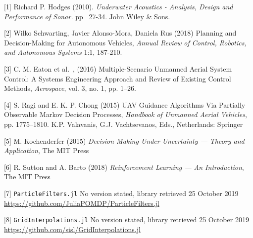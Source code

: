 \documentclass{article}
\begin{document}
\small

[1]  Richard P. Hodges (2010). \textit{Underwater Acoustics - Analysis, Design and Performance of Sonar.} pp \, 27-34. John Wiley \& Sons.

[2] Wilko Schwarting, Javier Alonso-Mora, Daniela Rus (2018) Planning and Decision-Making for Autonomous Vehicles, \textit{Annual Review of Control, Robotics, and Autonomous Systems} 1:1, 187-210.

[3] C. M. Eaton et al.\ , (2016) Multiple-Scenario Unmanned Aerial System Control: A Systems Engineering Approach and Review of Existing Control Methods, \textit{Aerospace}, vol. 3, no. 1, pp. 1–26.

[4] S. Ragi and E. K. P. Chong (2015) UAV Guidance Algorithms Via Partially Observable Markov Decision Processes, \textit{Handbook of Unmanned Aerial Vehicles},  pp. 1775--1810. K.P. Valavanis, G.J. Vachtsevanos, Eds., Netherlands: Springer

[5] M. Kochenderfer (2015) \textit{Decision Making Under Uncertainty --- Theory and Application}, The MIT Press

[6] R. Sutton and A. Barto (2018) \textit{Reinforcement Learning --- An Introduction}, The MIT Press

[7] \texttt{ParticleFilters.jl} No version stated, library retrieved 25 October 2019 \url{https://github.com/JuliaPOMDP/ParticleFilters.jl}

[8] \texttt{GridInterpolations.jl} No version stated, library retrieved 25 October 2019 \url{https://github.com/sisl/GridInterpolations.jl}
\end{document}
